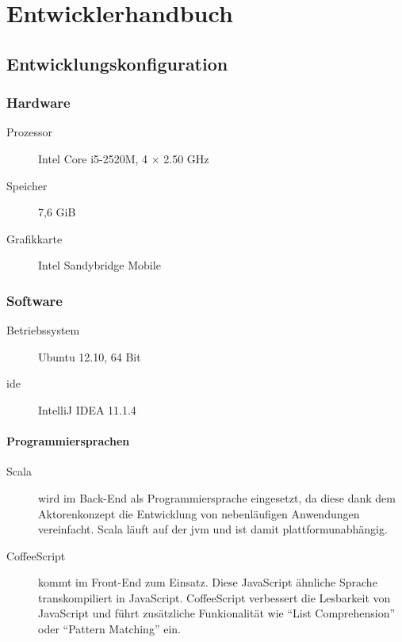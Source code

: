 \chapter{Entwicklerhandbuch}
\label{chap:entwicklerhandbuch}

\section{Entwicklungskonfiguration}
\label{sec:entwicklungskonfiguration}

\subsection{Hardware}
\label{sec:hardware}

\begin{description}
  \item[Prozessor] Intel Core i5-2520M, 4 $\times$ 2.50 GHz
  \item[Speicher] 7,6 GiB
  \item[Grafikkarte] Intel Sandybridge Mobile
\end{description}

\subsection{Software}
\label{sec:software}

\begin{description}
  \item[Betriebssystem] Ubuntu 12.10, 64 Bit
  \item[\ac{ide}] IntelliJ IDEA 11.1.4
\end{description}

\subsubsection{Programmiersprachen}
\label{sec:programmiersprachen}

\begin{description}
  \item[Scala\footnotemark]  wird im Back-End als Programmiersprache eingesetzt, da diese dank dem Aktorenkonzept die Entwicklung von nebenläufigen Anwendungen vereinfacht.
    Scala läuft auf der \ac{jvm} und ist damit plattformunabhängig.
  \item[CoffeeScript\footnotemark]  kommt im Front-End zum Einsatz.
    Diese JavaScript ähnliche Sprache transkompiliert in JavaScript.
    CoffeeScript verbessert die Lesbarkeit von JavaScript und führt zusätzliche Funkionalität wie ``List Comprehension'' oder ``Pattern Matching'' ein.
\end{description}

